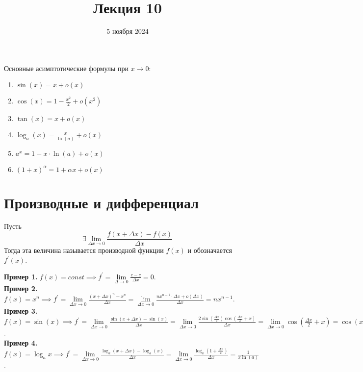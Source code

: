\documentclass{article}
\title{Лекция 10}
\author{}
\date{5 ноября 2024}
\begin{document}
\maketitle

\noindent Основные асимптотические формулы при \(x \to 0\):
\begin{enumerate}[leftmargin=1cm]
    \item \(\sin(x) = x + o(x)\)
    \item \(\displaystyle \cos(x) = 1 - \frac{x^2}{2} + o(x^2)\)
    \item \(\tan(x) = x + o(x)\)
    \item \(\displaystyle \log_a(x) = \frac{x}{\ln(a)} + o(x)\)
    \item \(a^x = 1 + x \cdot \ln(a) + o(x)\)
    \item \((1 + x)^\alpha = 1 + \alpha x + o(x)\)      
\end{enumerate}

\section*{Производные и дифференциал}

\begin{definition}
    Пусть \[\exists \lim\limits_{\Delta x \to 0} \frac{f(x + \Delta x) - f(x)}{\Delta x}\]
    Тогда эта величина называется производной функции \(f(x)\) и обозначается \(f^{\prime}(x)\).     
\end{definition}
\noindent
\textbf{Пример 1.} \(\displaystyle f(x) = const \implies f^{\prime} = \lim\limits_{\Delta \to 0} \frac{c - c}{\Delta x} = 0\).\\[0.15cm]
\textbf{Пример 2.} \(\displaystyle f(x) = x^n \implies f^{\prime} = \lim\limits_{\Delta x \to 0} \frac{(x + \Delta x)^n - x^n}{\Delta x} = \lim\limits_{\Delta x \to 0} \frac{n x^{n - 1} \cdot \Delta x + o(\Delta x)}{\Delta x} = n x^{n - 1}\).\\[0.15cm]
\textbf{Пример 3.} \(\displaystyle f(x) = \sin(x) \implies f^{\prime} = \lim\limits_{\Delta x \to 0} \frac{\sin(x + \Delta x) - \sin(x)}{\Delta x} = \lim\limits_{\Delta x \to 0} \frac{\displaystyle 2\sin\left(\frac{\Delta x}{2}\right)\cos\left(\frac{\displaystyle \Delta x}{2} + x\right)}{\Delta x} = \lim\limits_{\Delta x \to 0} \cos\left(\frac{\Delta x}{2} + x\right) = \cos(x)\).\\[0.15cm]
\textbf{Пример 4.} \(\displaystyle f(x) = \log_a{x} \implies f^{\prime} = \lim\limits_{\Delta x \to 0} \frac{\log_a(x + \Delta x) - \log_a(x)}{\Delta x} = \lim\limits_{\Delta x \to 0} \frac{\displaystyle \log_a\left(1 + \frac{\Delta x}{x}\right)}{\Delta x} = \frac{1}{x\ln(a)}\).
\end{document}
